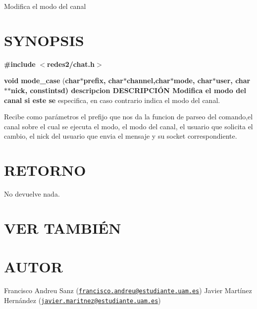 Modifica el modo del canal\hypertarget{unknown_case_SYNOPSIS}{}\section{S\-Y\-N\-O\-P\-S\-I\-S}\label{unknown_case_SYNOPSIS}
{\bfseries \#include} {\bfseries $<$redes2/chat.\-h$>$} 

{\bfseries void} {\bfseries mode\-\_\-case} {\bfseries }({\bfseries char{\bfseries $\ast${\bfseries prefix{\bfseries },} {\bfseries char{\bfseries $\ast${\bfseries channel{\bfseries },{\bfseries char{\bfseries $\ast${\bfseries mode{\bfseries },} {\bfseries char{\bfseries $\ast${\bfseries user{\bfseries },} {\bfseries char{\bfseries $\ast$$\ast${\bfseries nick{\bfseries },} const{\bfseries int{\bfseries sd{\bfseries })}  } } descripcion} D\-E\-S\-C\-R\-I\-P\-C\-IÓ\-N}  Modifica} el} modo} del} canal} si} este} se} especifica, en caso contrario indica el modo del canal.

Recibe como parámetros el prefijo que nos da la funcion de parseo del comando,el canal sobre el cual se ejecuta el modo, el modo del canal, el usuario que solicita el cambio, el nick del usuario que envia el mensaje y su socket correspondiente.\hypertarget{unknown_case_retorno}{}\section{R\-E\-T\-O\-R\-N\-O}\label{unknown_case_retorno}
No devuelve nada.\hypertarget{unknown_case_seealso}{}\section{V\-E\-R T\-A\-M\-B\-IÉ\-N}\label{unknown_case_seealso}
{\bfseries } \hypertarget{unknown_case_authors}{}\section{A\-U\-T\-O\-R}\label{unknown_case_authors}
Francisco Andreu Sanz (\href{mailto:francisco.andreu@estudiante.uam.es}{\tt francisco.\-andreu@estudiante.\-uam.\-es}) Javier Martínez Hernández (\href{mailto:javier.maritnez@estudiante.uam.es}{\tt javier.\-maritnez@estudiante.\-uam.\-es}) 